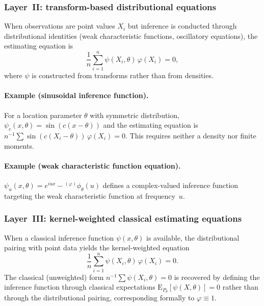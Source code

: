 \documentclass[11pt,a4paper]{article}
\newcommand{\E}{\mathrm{E}}
\begin{document}
\subsubsection*{Layer~II: transform-based distributional equations}

When observations are point values $X_i$ but inference is conducted through
distributional identities (weak characteristic functions, oscillatory
equations), the estimating equation is
\begin{equation}\label{eq:transform-estimating}
\frac{1}{n} \sum_{i=1}^n \psi(X_i, \theta)\,\varphi(X_i) = 0,
\end{equation}
where $\psi$ is constructed from transforms rather than from densities.

\paragraph{Example (sinusoidal inference function).}
For a location parameter $\theta$ with symmetric distribution,
$\psi_c(x, \theta) = \sin(c(x - \theta))$ and the estimating equation is
$n^{-1}\sum \sin(c(X_i - \theta))\,\varphi(X_i) = 0$.  This requires
neither a density nor finite moments.

\paragraph{Example (weak characteristic function equation).}
$\psi_u(x, \theta) = e^{iux} - {}^{(\varphi)}\phi_\theta(u)$ defines a
complex-valued inference function targeting the weak characteristic function
at frequency~$u$.

\subsubsection*{Layer~III: kernel-weighted classical estimating equations}

When a classical inference function $\psi(x, \theta)$ is available, the
distributional pairing with point data yields the kernel-weighted equation
\begin{equation}\label{eq:kernel-weighted}
\frac{1}{n} \sum_{i=1}^n \psi(X_i, \theta)\,\varphi(X_i) = 0.
\end{equation}
The classical (unweighted) form
$n^{-1}\sum \psi(X_i, \theta) = 0$
is recovered by defining the inference function through classical
expectations $\E_{P_\theta}[\psi(X, \theta)] = 0$ rather than through the
distributional pairing, corresponding formally to $\varphi \equiv 1$.
\end{document}
